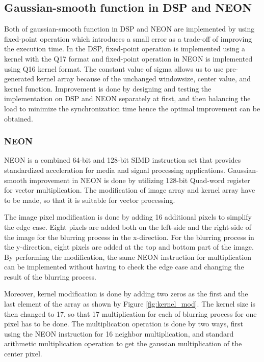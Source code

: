 \documentclass[conference]{IEEEtran}
\begin{document}
\subsection{Gaussian-smooth function in DSP and NEON}
Both of gaussian-smooth function in DSP and NEON are implemented by using fixed-point operation which introduces a small error as a trade-off of improving the execution time. In the DSP, fixed-point operation is implemented using a kernel with the Q17 format and fixed-point operation in NEON is implemented using Q16 kernel format. The constant value of sigma allows us to use pre-generated kernel array because of the unchanged windowsize, center value, and kernel function. Improvement is done by designing and testing the implementation on DSP and NEON separately at first, and then balancing the load to minimize the synchronization time hence the optimal improvement can be obtained. 

\subsubsection{NEON}
NEON is a combined 64-bit and 128-bit SIMD instruction set that provides standardized acceleration for media and signal processing applications. Gaussian-smooth improvement in NEON is done by utilizing 128-bit Quad-word register for vector multiplication. The modification of image array and kernel array have to be made, so that it is suitable for vector processing. 

The image pixel modification is done by adding 16 additional pixels to simplify the edge case. Eight pixels are added both on the left-side and the right-side of the image for the blurring process in the x-direction. For the blurring process in the y-direction, eight pixels are added at the top and bottom part of the image. By performing the modification, the same NEON instruction for multiplication can be implemented without having to check the edge case and changing the result of the blurring process. 

Moreover, kernel modification is done by adding two zeros as the first and the last element of the array as shown by Figure \ref{fig:kernel_mod}. The kernel size is then changed to 17, so that 17 multiplication for each of blurring process for one pixel has to be done. The multiplication operation is done by two ways, first using the NEON instruction for 16 neighbor multiplication, and standard arithmetic multiplication operation to get the gaussian multiplication of the center pixel. 
\end{document}
